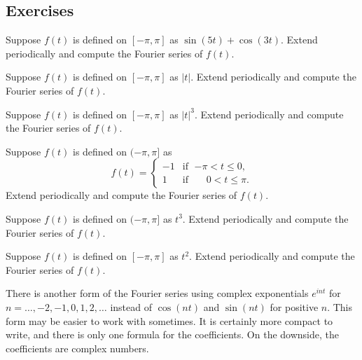 \subsection{Exercises}

\begin{exercise}
Suppose $f(t)$ is defined on $[-\pi,\pi]$ as $\sin (5t) + \cos (3t)$.  Extend
periodically and compute the Fourier series of $f(t)$.
\end{exercise}

\begin{exercise}
Suppose $f(t)$ is defined on $[-\pi,\pi]$ as $\lvert t \rvert$.
Extend periodically and compute the Fourier series of $f(t)$.
\end{exercise}

\begin{exercise}
Suppose $f(t)$ is defined on $[-\pi,\pi]$ as $\lvert t \rvert^3$.
Extend periodically and compute the Fourier series of $f(t)$.
\end{exercise}

\begin{exercise}
Suppose $f(t)$ is defined on $(-\pi,\pi]$ as
\begin{equation*}
f(t) =
\begin{cases}
-1 & \text{if } \; {-\pi} < t \leq 0 , \\
1 & \text{if } \; \phantom{-}0 < t \leq \pi .
\end{cases}
\end{equation*}
Extend periodically and compute the Fourier series of $f(t)$.
\end{exercise}

\begin{exercise}
Suppose $f(t)$ is defined on $(-\pi,\pi]$ as $t^3$.
Extend periodically and compute the Fourier series of $f(t)$.
\end{exercise}

\begin{exercise}
Suppose $f(t)$ is defined on $[-\pi,\pi]$ as $t^2$.
Extend periodically and compute the Fourier series of $f(t)$.
\end{exercise}

There is another form of the Fourier series using complex exponentials
$e^{int}$ for $n=\ldots,-2,-1,0,1,2,\ldots$ instead of
$\cos(nt)$ and $\sin(nt)$ for positive $n$.  This form may be easier
to work with sometimes.  It is certainly more compact to write,
and there is only one formula for the coefficients.  On the downside,
the coefficients are complex numbers.


